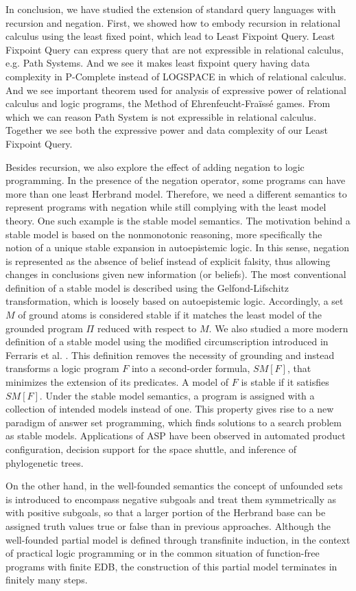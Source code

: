 In conclusion, we have studied the extension of standard query languages with recursion and negation. First, we showed how to embody recursion in relational calculus using the least fixed point, which lead to Least Fixpoint Query. Least Fixpoint Query can express query that are not expressible in relational calculus, e.g.  Path Systems. And we see it makes least fixpoint query having data complexity in P-Complete instead of LOGSPACE in which of relational calculus. And we see important theorem used for analysis of expressive power of relational calculus and logic programs, the Method of Ehrenfeucht-Fra\"{i}ss\'{e} games. From which we can reason Path System is not expressible in relational calculus. Together we see both the expressive power and data complexity of our Least Fixpoint Query. 

Besides recursion, we also explore the effect of adding negation 
to logic programming. In the presence of the negation operator, 
some programs can have more than one least Herbrand model. Therefore, 
we need a different semantics to represent programs with negation 
while still complying with the least model theory. One such 
example is the stable model semantics. The motivation behind 
a stable model is based on the nonmonotonic reasoning, more 
specifically the notion of a unique stable expansion in 
autoepistemic logic. In this sense, negation is represented as 
the absence of belief instead of explicit falsity, thus allowing 
changes in conclusions given new information (or beliefs). The 
most conventional definition of a stable model is described 
using the Gelfond-Lifschitz transformation, which is loosely based on 
autoepistemic logic. Accordingly, a set $M$ of ground atoms is considered 
stable if it matches the least model of the grounded program $\Pi$ reduced 
with respect to $M$. We also studied a more modern definition of a stable 
model using the modified circumscription introduced in Ferraris et al. \cite{lee}. 
This definition removes the necessity of grounding and instead transforms 
a logic program $F$ into a second-order formula, $SM[F]$, that minimizes the extension of 
its predicates. A model of $F$ is stable if it satisfies $SM[F]$. 
Under the stable model semantics, a program is assigned with a 
collection of intended models instead of one. This property 
gives rise to a new paradigm of answer set programming, 
which finds solutions to a search problem as stable models. Applications 
of ASP have been observed in automated product configuration, decision 
support for the space shuttle, and inference of phylogenetic trees.

On the other hand, in the well-founded semantics the concept of unfounded sets is introduced to encompass negative subgoals and treat them symmetrically as with positive subgoals, so that a larger portion of the Herbrand base can be assigned truth values true or false than in previous approaches. Although the well-founded partial model is defined through transfinite induction, in the context of practical logic programming or in the common situation of function-free programs with finite EDB, the construction of this partial model terminates in finitely many steps.
